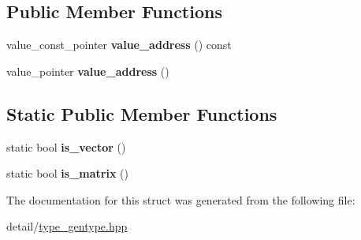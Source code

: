 \subsection*{Public Member Functions}
\begin{DoxyCompactItemize}
\item 
\hypertarget{structglm_1_1detail_1_1genType_a63fb77e77082f34c0a0d7faa0906f7f4}{value\-\_\-const\-\_\-pointer {\bfseries value\-\_\-address} () const }\label{structglm_1_1detail_1_1genType_a63fb77e77082f34c0a0d7faa0906f7f4}

\item 
\hypertarget{structglm_1_1detail_1_1genType_a146973ec142766743080c1895a9e3c65}{value\-\_\-pointer {\bfseries value\-\_\-address} ()}\label{structglm_1_1detail_1_1genType_a146973ec142766743080c1895a9e3c65}

\end{DoxyCompactItemize}
\subsection*{Static Public Member Functions}
\begin{DoxyCompactItemize}
\item 
\hypertarget{structglm_1_1detail_1_1genType_ae83087df55201bdc46a37decf3d1c34c}{static bool {\bfseries is\-\_\-vector} ()}\label{structglm_1_1detail_1_1genType_ae83087df55201bdc46a37decf3d1c34c}

\item 
\hypertarget{structglm_1_1detail_1_1genType_a78c650375558d5e2ccfba383cdb59479}{static bool {\bfseries is\-\_\-matrix} ()}\label{structglm_1_1detail_1_1genType_a78c650375558d5e2ccfba383cdb59479}

\end{DoxyCompactItemize}


The documentation for this struct was generated from the following file\-:\begin{DoxyCompactItemize}
\item 
detail/\hyperlink{type__gentype_8hpp}{type\-\_\-gentype.\-hpp}\end{DoxyCompactItemize}
